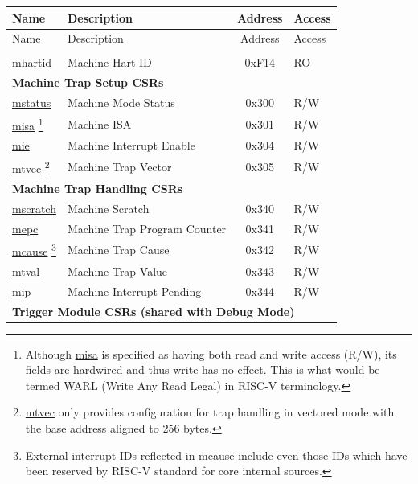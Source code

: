 \begin{longtable}{ | p{4.0cm} | p{8.4cm} | c | l | }
\hline\rowcolor{lightgray}
Name & Description & Address & Access \\ \hline
\endfirsthead
\hline
\rowcolor{lightgray}
Name & Description & Address & Access \\
\hline
\endhead
\endfoot

\multicolumn{4}{|l|}{\textbf{Machine Information CSR}} \\\hline
\hyperref[regdesc:LPMHARTID]{mhartid} & Machine Hart ID & 0xF14 & RO \\\hline
\multicolumn{4}{|l|}{\textbf{Machine Trap Setup CSRs}} \\\hline
\hyperref[regdesc:LPMSTATUS]{mstatus} & Machine Mode Status & 0x300 & R/W \\\hline
\hyperref[regdesc:LPMISA]{misa} \footnote{Although \hyperref[regdesc:LPMISA]{misa} is specified as having both read and write access (R/W), its fields are hardwired and thus write has no effect. This is what would be termed WARL (Write Any Read Legal) in RISC-V terminology.} & Machine ISA & 0x301 & R/W \\\hline
\hyperref[regdesc:LPMIE]{mie} & Machine Interrupt Enable & 0x304 & R/W \\\hline
\hyperref[regdesc:LPMTVEC]{mtvec} \footnote{\hyperref[regdesc:LPMTVEC]{mtvec} only provides configuration for trap handling in vectored mode with the base address aligned to 256 bytes.} & Machine Trap Vector & 0x305 & R/W \\\hline
\multicolumn{4}{|l|}{\textbf{Machine Trap Handling CSRs}} \\\hline
\hyperref[regdesc:LPMSCRATCH]{mscratch} & Machine Scratch & 0x340 & R/W \\\hline
\hyperref[regdesc:LPMEPC]{mepc} & Machine Trap Program Counter & 0x341 & R/W \\\hline
\hyperref[regdesc:LPMCAUSE]{mcause} \footnote{External interrupt IDs reflected in \hyperref[regdesc:LPMCAUSE]{mcause} include even those IDs which have been reserved by RISC-V standard for core internal sources.} & Machine Trap Cause & 0x342 & R/W \\\hline
\hyperref[regdesc:LPMTVAL]{mtval} & Machine Trap Value & 0x343 & R/W \\\hline
\hyperref[regdesc:LPMIP]{mip} & Machine Interrupt Pending & 0x344 & R/W \\\hline
\multicolumn{4}{|l|}{\textbf{Trigger Module CSRs (shared with Debug Mode)}} \\\hline

\end{longtable}

